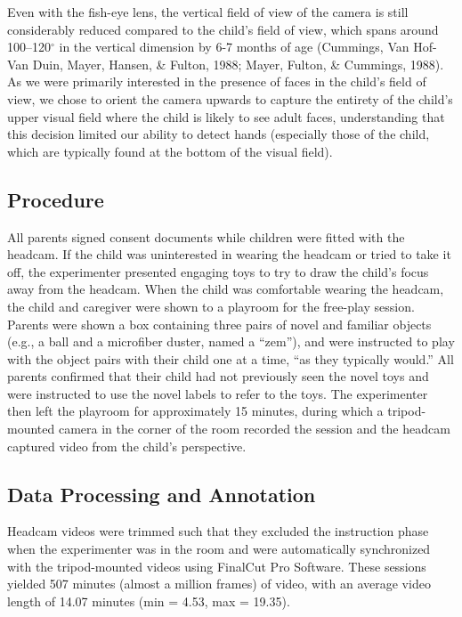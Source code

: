 \documentclass[english,man]{apa6}
\begin{document}
Even with the fish-eye lens, the vertical field of view of the camera is
still considerably reduced compared to the child's field of view, which
spans around 100--120\(^{\circ}\) in the vertical dimension by 6-7
months of age (Cummings, Van Hof-Van Duin, Mayer, Hansen, \& Fulton,
1988; Mayer, Fulton, \& Cummings, 1988). As we were primarily interested
in the presence of faces in the child's field of view, we chose to
orient the camera upwards to capture the entirety of the child's upper
visual field where the child is likely to see adult faces, understanding
that this decision limited our ability to detect hands (especially those
of the child, which are typically found at the bottom of the visual
field).

\subsection{Procedure}\label{procedure}

All parents signed consent documents while children were fitted with the
headcam. If the child was uninterested in wearing the headcam or tried
to take it off, the experimenter presented engaging toys to try to draw
the child's focus away from the headcam. When the child was comfortable
wearing the headcam, the child and caregiver were shown to a playroom
for the free-play session. Parents were shown a box containing three
pairs of novel and familiar objects (e.g., a ball and a microfiber
duster, named a \enquote{zem}), and were instructed to play with the
object pairs with their child one at a time, \enquote{as they typically
would.} All parents confirmed that their child had not previously seen
the novel toys and were instructed to use the novel labels to refer to
the toys. The experimenter then left the playroom for approximately 15
minutes, during which a tripod-mounted camera in the corner of the room
recorded the session and the headcam captured video from the child's
perspective.

\subsection{Data Processing and
Annotation}\label{data-processing-and-annotation}

Headcam videos were trimmed such that they excluded the instruction
phase when the experimenter was in the room and were automatically
synchronized with the tripod-mounted videos using FinalCut Pro Software.
These sessions yielded 507 minutes (almost a million frames) of video,
with an average video length of 14.07 minutes (min = 4.53, max = 19.35).
\end{document}
